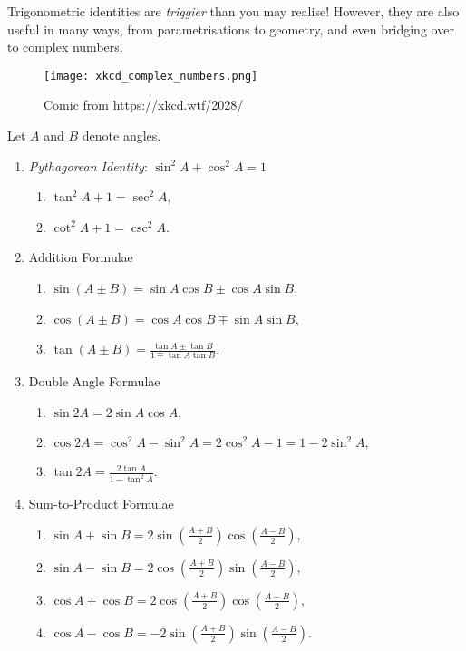 \documentclass[../main.tex]{subfiles}
\begin{document}
Trigonometric identities are \textit{triggier} than you may realise! However, they are also useful in many ways, from parametrisations to geometry, and even bridging over to complex numbers.
\begin{figure}[H]
    \centering
    \texttt{[image: xkcd\_complex\_numbers.png]}
    \caption{Comic from https://xkcd.wtf/2028/}
\end{figure}

\begin{proposition}
    Let $A$ and $B$ denote angles.
    \begin{enumerate}
        \item \textit{Pythagorean Identity}: $\sin^2A+\cos^2A=1$
        \begin{enumerate}
            \item $\tan^2A+1=\sec^2A$,
            \item $\cot^2A+1=\csc^2A$.
        \end{enumerate}
        \item Addition Formulae
        \begin{enumerate}
            \item $\sin(A\pm B)=\sin A\cos B\pm \cos A\sin B$,
            \item $\cos(A\pm B)=\cos A\cos B\mp \sin A\sin B$,
            \item $\tan(A\pm B)=\frac{\tan A\pm\tan B}{1\mp \tan A\tan B}.$
        \end{enumerate}
        \item Double Angle Formulae
        \begin{enumerate}
            \item $\sin 2A=2\sin A\cos A$,
            \item $\cos 2A=\cos^2A-\sin^2A=2\cos^2A-1=1-2\sin^2A,$
            \item $\tan 2A=\frac{2\tan A}{1-\tan^2 A}.$
        \end{enumerate}  
        \item Sum-to-Product Formulae
        \begin{enumerate}
            \item $\sin A+\sin B=2\sin\left(\frac{A+B}{2}\right)\cos\left(\frac{A-B}{2}\right),$
            \item $\sin A-\sin B=2\cos\left(\frac{A+B}{2}\right)\sin\left(\frac{A-B}{2}\right),$
            \item $\cos A+\cos B=2\cos\left(\frac{A+B}{2}\right)\cos\left(\frac{A-B}{2}\right),$
            \item $\cos A-\cos B=-2\sin\left(\frac{A+B}{2}\right)\sin\left(\frac{A-B}{2}\right).$
        \end{enumerate}
    \end{enumerate}
\end{proposition}
\end{document}
